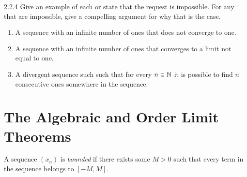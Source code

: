 \begin{exercise}
    {2.2.4} Give an example of each or state that the request is impossible.
    For any that are impossible, give a compelling argument for why that is the case.
    \begin{enumerate}
        \item A sequence with an infinite number of ones that does not converge to one.
        \item A sequence with an infinite number of ones that converges to a limit not equal to one.
        \item A divergent sequence such such that for every \(n \in \mathbb{N}\) it is possible to find \(n\) consecutive ones somewhere in the sequence.
    \end{enumerate}
\end{exercise}


\section{The Algebraic and Order Limit Theorems}

\begin{definition}
    A sequence $(x_n)$ is \textit{bounded} if there exists some $M > 0$ such that every term in the sequence belongs to $[-M,M]$.
\end{definition}

